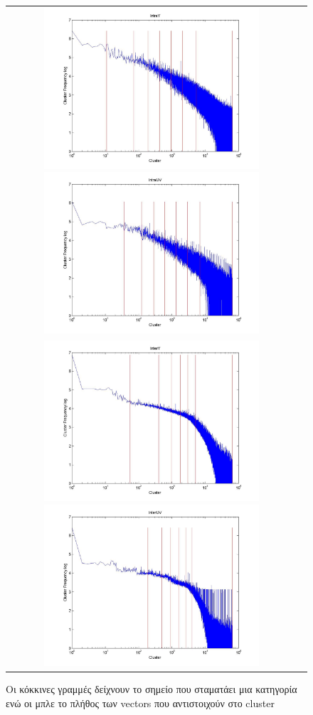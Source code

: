  \begin{figure}[h]
\centering
\begin{tabular}{c c}
    \includegraphics[height=6.0cm]{chapter4/IntraY.jpg}
    \includegraphics[height=6.0cm]{chapter4/IntraUV.jpg}\\
    \includegraphics[height=6.0cm]{chapter4/InterY.jpg}
    \includegraphics[height=6.0cm]{chapter4/InterUV.jpg}
\end{tabular}
\caption{Οι κόκκινες γραμμές δείχνουν το σημείο που σταματάει μια κατηγορία ενώ οι μπλε το πλήθος των vectors που αντιστοιχούν στο cluster}
\label{fig:cat}
\end{figure}

